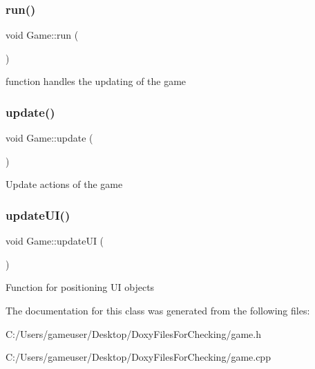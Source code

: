 \mbox{\label{class_game_a1ab78f5ed0d5ea879157357cf2fb2afa}} 
\subsubsection{\texorpdfstring{run()}{run()}}
{\footnotesize\ttfamily void Game\+::run (\begin{DoxyParamCaption}{ }\end{DoxyParamCaption})}



function handles the updating of the game 

\mbox{\label{class_game_a79df6376b332d63c9eca0dcee30305c3}} 
\subsubsection{\texorpdfstring{update()}{update()}}
{\footnotesize\ttfamily void Game\+::update (\begin{DoxyParamCaption}{ }\end{DoxyParamCaption})}



Update actions of the game 

\mbox{\label{class_game_a9f1f11b62bf54070912cb94ad8e990df}} 
\subsubsection{\texorpdfstring{updateUI()}{updateUI()}}
{\footnotesize\ttfamily void Game\+::update\+UI (\begin{DoxyParamCaption}{ }\end{DoxyParamCaption})}



Function for positioning UI objects 



The documentation for this class was generated from the following files\+:\begin{DoxyCompactItemize}
\item 
C\+:/\+Users/gameuser/\+Desktop/\+Doxy\+Files\+For\+Checking/game.\+h\item 
C\+:/\+Users/gameuser/\+Desktop/\+Doxy\+Files\+For\+Checking/game.\+cpp\end{DoxyCompactItemize}
